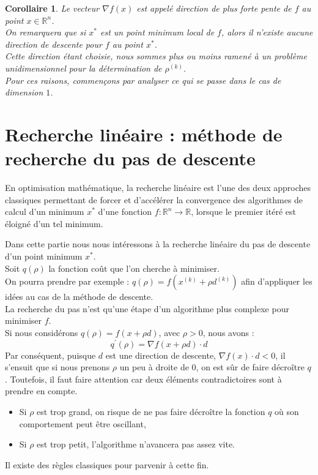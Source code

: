 \documentclass[12pt,a4paper,openay]{book}
\numberwithin{equation}{chapter}
\newtheorem{coro}{Corollaire}[chapter]
\newcommand{\R}{\mathbb{R}}
\newcommand{\rok}{\rho^{(k)}}
\newcommand{\gf}{\nabla f(x)}
\begin{document}
	\begin{coro}
	Le vecteur $\gf$ est appel\'e direction de plus forte pente de $f$ au point $x\in\R^n$.\\
	On remarquera que si $x^*$ est un point minimum local de $f$, alors il n'existe aucune direction de descente pour $f$ au point $x^*$.\\
	Cette direction \'etant choisie, nous sommes plus ou moins ramen\'e \`a un probl\`eme unidimensionnel pour la d\'etermination de $\rok$. \\
	Pour ces raisons, commen\c{c}ons par analyser ce qui se passe dans le cas de dimension $1$.
	\end{coro}
	
	\section{Recherche lin\'eaire : m\'ethode de recherche du pas de descente}
	En optimisation math\'ematique, la recherche lin\'eaire est l'une des deux approches classiques permettant de forcer et d'acc\'el\'erer la convergence des algorithmes de calcul d'un minimum $x^{*}$ d'une fonction $f: \R^{n} \to \R$, lorsque le premier it\'er\'e est \'eloign\'e d'un tel minimum.		
	
	Dans cette partie nous nous int\'eressons \`a la recherche lin\'eaire du pas de descente d'un point minimum $x^{*}$.\\	
	Soit $q(\rho)$ la fonction coût que l'on cherche \`a minimiser.\\	
	On pourra prendre par exemple :	
	$
	q(\rho)=f\left(x^{(k)}+\rho d^{(k)}\right)
	$ afin d'appliquer les id\'ees au cas de la m\'ethode de descente.\\	
	La recherche du pas n'est qu'une \'etape d'un algorithme plus complexe pour minimiser $f$.\\	
	Si nous consid\'erons $q(\rho)=f(x+\rho d)$, avec $\rho>0$, nous avons :	
	$$
	q^{\prime}(\rho)=\nabla f(x+\rho d) \cdot d
	$$	
	Par cons\'equent, puisque $d$ est une direction de descente, $\nabla f(x) \cdot d<0$, il s'ensuit que si nous prenons $\rho$ un peu \`a droite de $0$, on est sûr de faire d\'ecro\^itre $q$. Toutefois, il faut faire attention car deux \'el\'ements contradictoires sont \`a prendre en compte.
	
	\begin{itemize}
		\item[$\bullet$] Si $\rho$ est trop grand, on risque de ne pas faire d\'ecro\^itre la fonction $q$ où son comportement peut \^etre oscillant,
		\item[$\bullet$] Si $\rho$ est trop petit, l'algorithme n'avancera pas assez vite.
	\end{itemize}	
	Il existe des r\`egles classiques pour parvenir \`a cette fin.
	
\end{document}
